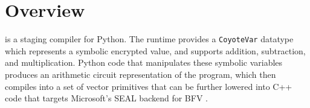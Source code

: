 \section{\system Overview}\label{sec:overview}
\system is a staging compiler for Python.
The runtime provides a \texttt{CoyoteVar} datatype which represents a symbolic encrypted value, and supports addition, subtraction, and multiplication.
Python code that manipulates these symbolic variables produces an arithmetic circuit representation of the program, which \system then compiles into a set of vector primitives that can be further lowered into C++ code that targets Microsoft's SEAL backend for BFV \cite{seal}.


 
